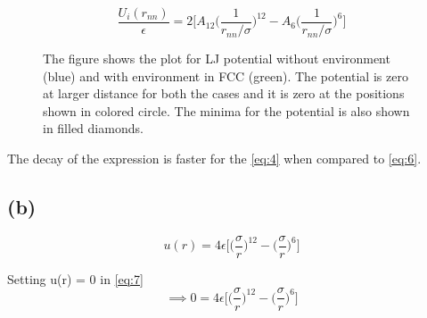 \documentclass{article}
\begin{document}
\begin{equation}
\boxed{\frac{U_{i}(r_{nn})}{\epsilon} = 2 \Big[A_{12}\Big(\frac{1}{r_{nn}/\sigma}\Big)^{12} - A_6\Big(\frac{1}{r_{nn}/\sigma}\Big)^6\Big] \label{eq:6}}
\end{equation}

\begin{figure}[H]
\begin{centering}
\caption{The figure shows the plot for LJ potential without environment (blue) and with environment in FCC (green). The potential is zero at larger distance for both the cases and it is zero at the positions shown in colored circle. The minima for the potential is also shown in filled diamonds.}
\label{fig:fig1}
\end{centering}
\end{figure}

The decay of the expression is faster for the \eqref{eq:4} when compared to \eqref{eq:6}.

\subsection{(b)}
\label{sec-4-2}
\begin{equation}
\boxed{u(r) = 4\epsilon\Big[\big(\frac{\sigma}{r}\big)^{12}-\big(\frac{\sigma}{r}\big)^6\Big] \label{eq:7}}
\end{equation}

Setting u(r) = 0 in \eqref{eq:7}
$$\implies 0 = 4\epsilon\Big[\big(\frac{\sigma}{r}\big)^{12}-\big(\frac{\sigma}{r}\big)^6\Big]$$
\end{document}
